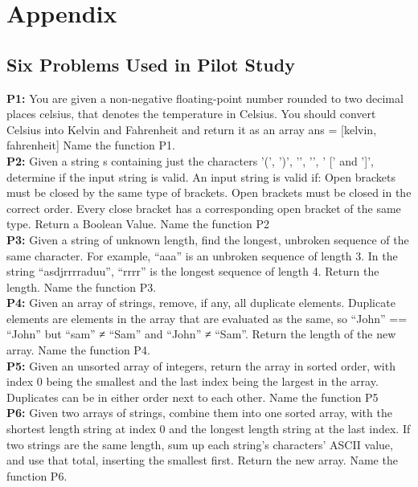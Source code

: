 \documentclass[manuscript,screen,review,sigconf]{acmart}
\begin{document}



\section{Appendix}

\subsection{Six Problems Used in Pilot Study}

\textbf{P1:} You are given a non-negative floating-point number rounded to two decimal places celsius, that denotes the temperature in Celsius. You should convert Celsius into Kelvin and Fahrenheit and return it as an array ans = [kelvin, fahrenheit] Name the function P1.\\

\textbf{P2:} Given a string s containing just the characters '(', ')', '{', '}', ' [' and ']', determine if the input string is valid. An input string is valid if: Open brackets must be closed by the same type of brackets. Open brackets must be closed in the correct order. Every close bracket has a corresponding open bracket of the same type. Return a Boolean Value. Name the function P2\\

\textbf{P3:} Given a string of unknown length, find the longest, unbroken sequence of the same character. For example, “aaa” is an unbroken sequence of length 3. In the string “asdjrrrraduu”, “rrrr” is the longest sequence of length 4. Return the length. Name the function P3.\\

\textbf{P4:} Given an array of strings, remove, if any, all duplicate elements. Duplicate elements are elements in the array that are evaluated as the same, so “John” == “John” but “sam” ≠ “Sam” and “John” ≠ “Sam”. Return the length of the new array. Name the function P4.\\

\textbf{P5:} Given an unsorted array of integers, return the array in sorted order, with index 0 being the smallest and the last index being the largest in the array. Duplicates can be in either order next to each other. Name the function P5\\

\textbf{P6:} Given two arrays of strings, combine them into one sorted array, with the shortest length string at index 0 and the longest length string at the last index. If two strings are the same length, sum up each string’s characters’ ASCII value, and use that total, inserting the smallest first. Return the new array. Name the function P6.\\
\end{document}
